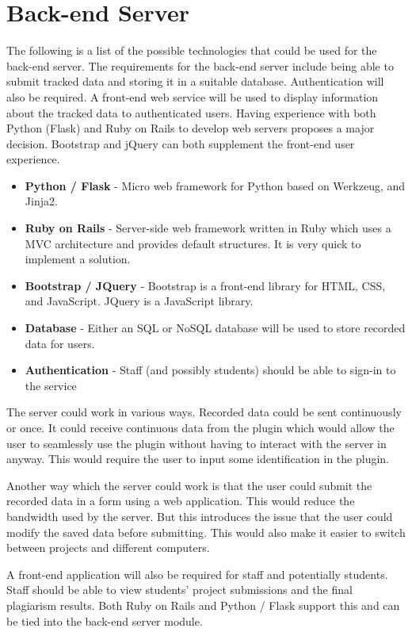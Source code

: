 \section{Back-end Server}
The following is a list of the possible technologies that could be used for the back-end server. The requirements for the back-end server include being able to submit tracked data and storing it in a suitable database. Authentication will also be required. A front-end web service will be used to display information about the tracked data to authenticated users. Having experience with both Python (Flask) and Ruby on Rails to develop web servers proposes a major decision. Bootstrap and jQuery can both supplement the front-end user experience.

\begin{itemize}
  \item \textbf{Python / Flask} - Micro web framework for Python based on Werkzeug, and Jinja2.
  \item \textbf{Ruby on Rails} - Server-side web framework written in Ruby which uses a MVC architecture and provides default structures. It is very quick to implement a solution.
  \item \textbf{Bootstrap / JQuery} - Bootstrap is a front-end library for HTML, CSS, and JavaScript. JQuery is a JavaScript library.
  \item \textbf{Database} - Either an SQL or NoSQL database will be used to store recorded data for users.
  \item \textbf{Authentication} - Staff (and possibly students) should be able to sign-in to the service
\end{itemize}

The server could work in various ways. Recorded data could be sent continuously or once. It could receive continuous data from the plugin which would allow the user to seamlessly use the plugin without having to interact with the server in anyway. This would require the user to input some identification in the plugin.

Another way which the server could work is that the user could submit the recorded data in a form using a web application. This would reduce the bandwidth used by the server. But this introduces the issue that the user could modify the saved data before submitting. This would also make it easier to switch between projects and different computers.

A front-end application will also be required for staff and potentially students. Staff should be able to view students' project submissions and the final plagiarism results. Both Ruby on Rails and Python / Flask support this and can be tied into the back-end server module.

